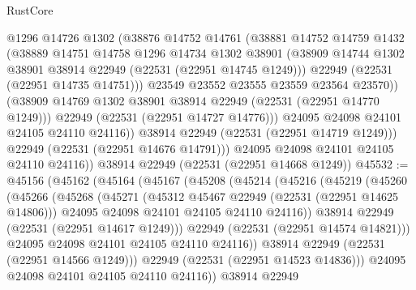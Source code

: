\begin{lexlean}{RustCore}
\begin{coremodule}
                  @1296
                  @14726
                  @1302
                  (@38876
                    @14752
                    @14761
                    (@38881
                      @14752
                      @14759
                      @1432
                      (@38889
                        @14751
                        @14758
                        @1296
                        @14734
                        @1302
                        @38901
                        (@38909 @14744 @1302 @38901 @38914 @22949 (@22531 (@22951 @14745 @1249)))
                        @22949
                        (@22531 (@22951 @14735 @14751)))
                      @23549
                      @23552
                      @23555
                      @23559
                      @23564
                      @23570))
                  (@38909 @14769 @1302 @38901 @38914 @22949 (@22531 (@22951 @14770 @1249)))
                  @22949
                  (@22531 (@22951 @14727 @14776)))
                @24095
                @24098
                @24101
                @24105
                @24110
                @24116))
            @38914
            @22949
            (@22531 (@22951 @14719 @1249)))
          @22949
          (@22531 (@22951 @14676 @14791)))
        @24095
        @24098
        @24101
        @24105
        @24110
        @24116))
    @38914
    @22949
    (@22531 (@22951 @14668 @1249))
@45532 := @45156
    (@45162
      (@45164
        (@45167
          (@45208
            (@45214
              (@45216
                (@45219
                  (@45260
                    (@45266
                      (@45268
                        (@45271
                          (@45312 @45467 @22949 (@22531 (@22951 @14625 @14806)))
                          @24095
                          @24098
                          @24101
                          @24105
                          @24110
                          @24116))
                      @38914
                      @22949
                      (@22531 (@22951 @14617 @1249)))
                    @22949
                    (@22531 (@22951 @14574 @14821)))
                  @24095
                  @24098
                  @24101
                  @24105
                  @24110
                  @24116))
              @38914
              @22949
              (@22531 (@22951 @14566 @1249)))
            @22949
            (@22531 (@22951 @14523 @14836)))
          @24095
          @24098
          @24101
          @24105
          @24110
          @24116))
      @38914
      @22949

\end{coremodule}
\end{lexlean}
